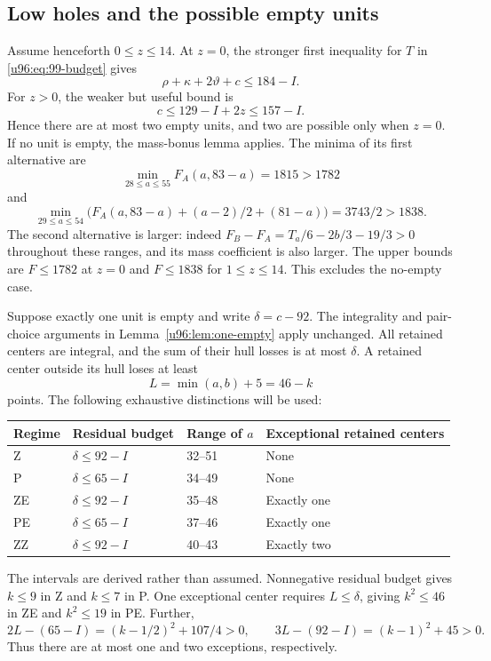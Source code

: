 \documentclass[11pt,a4paper]{article}
\theoremstyle{remark}
\begin{document}
\subsection{Low holes and the possible empty units}
Assume henceforth $0\leq z\leq14$. At $z=0$, the stronger first inequality
for $T$ in \eqref{u96:eq:99-budget} gives
\begin{equation}
 \rho+\kappa+2\vartheta+c\leq184-I.
 \label{u96:eq:99-zero}
\end{equation}
For $z>0$, the weaker but useful bound is
\begin{equation}
 c\leq129-I+2z\leq157-I.\label{u96:eq:99-positive}
\end{equation}
Hence there are at most two empty units, and two are possible only when
$z=0$. If no unit is empty, the mass-bonus lemma applies. The minima of
its first alternative are
\[
 \min_{28\leq a\leq55}F_A(a,83-a)=1815>1782
\]
and
\[
 \min_{29\leq a\leq54}
 \bigl(F_A(a,83-a)+(a-2)/2+(81-a)\bigr)
 =3743/2>1838.
\]
The second alternative is larger: indeed
$F_B-F_A=T_a/6-2b/3-19/3>0$ throughout these ranges, and its mass
coefficient is also larger. The upper bounds are $F\leq1782$ at $z=0$
and $F\leq1838$ for $1\leq z\leq14$. This excludes the no-empty case.

Suppose exactly one unit is empty and write $\delta=c-92$.
The integrality and pair-choice arguments in Lemma~\ref{u96:lem:one-empty}
apply unchanged. All retained centers are integral, and the sum of their
hull losses is at most $\delta$. A retained center outside its hull loses
at least
\[
 L=\min(a,b)+5=46-k
\]
points. The following exhaustive distinctions will be used:
\begin{center}\small
\begin{tabular}{llll}
\toprule
Regime&Residual budget&Range of $a$&Exceptional retained centers\\
\midrule
Z&$\delta\leq92-I$&32--51&None\\
P&$\delta\leq65-I$&34--49&None\\
ZE&$\delta\leq92-I$&35--48&Exactly one\\
PE&$\delta\leq65-I$&37--46&Exactly one\\
ZZ&$\delta\leq92-I$&40--43&Exactly two\\
\bottomrule
\end{tabular}
\end{center}
The intervals are derived rather than assumed. Nonnegative residual
budget gives $k\leq9$ in Z and $k\leq7$ in P. One exceptional center
requires $L\leq\delta$, giving $k^2\leq46$ in ZE and $k^2\leq19$ in PE.
Further,
\[
 2L-(65-I)=(k-1/2)^2+107/4>0,
 \qquad 3L-(92-I)=(k-1)^2+45>0.
\]
Thus there are at most one and two exceptions, respectively.
\end{document}
